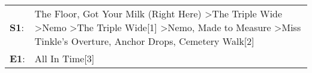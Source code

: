 \begin{supertabular}{p{0.03\textwidth}p{0.92\textwidth}}
 \textbf{S1}:  &  The Floor\textsuperscript{}, \enspace Got Your Milk (Right Here)\textsuperscript{} \textgreater \enspace The Triple Wide\textsuperscript{} \textgreater \enspace Nemo\textsuperscript{} \textgreater \enspace The Triple Wide[1]\textsuperscript{} \textgreater \enspace Nemo\textsuperscript{}, \enspace Made to Measure\textsuperscript{} \textgreater \enspace Miss Tinkle's Overture\textsuperscript{}, \enspace Anchor Drops\textsuperscript{}, \enspace Cemetery Walk[2]\textsuperscript{}  \enspace  \\
 \textbf{E1}:  &                                                                                                                                                                                                                                                                                                                                                                                                                                                                  All In Time[3]\textsuperscript{}  \enspace  \\
\end{supertabular}
